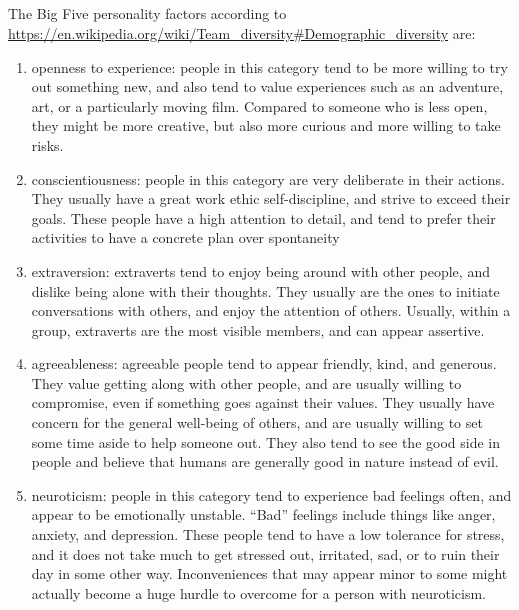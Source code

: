 \documentclass[letterpaper,12pt]{article}
\begin{document}
\subsection{}
The Big Five personality factors according to \url{https://en.wikipedia.org/wiki/Team_diversity#Demographic_diversity} are:
\begin{enumerate}
	\item openness to experience: people in this category tend to be more willing to try out something new, and also tend to
	      value experiences such as an adventure, art, or a particularly moving film. Compared to someone who is less open, they
	      might be more creative, but also more curious and more willing to take risks.
	\item conscientiousness: people in this category are very deliberate in their actions. They usually have a great work ethic
	      self-discipline, and strive to exceed their goals. These people have a high attention to detail, and tend to prefer their activities to have a concrete plan over spontaneity
	\item extraversion: extraverts tend to enjoy being around with other people, and dislike being alone with their thoughts. They usually are the ones to initiate conversations with others, and enjoy the attention of others. Usually, within a group,
	      extraverts are the most visible members, and can appear assertive.
	\item agreeableness:  agreeable people tend to appear friendly, kind, and generous. They value getting along with other people, and are usually willing to compromise, even if something goes against their values. They usually have concern for the general
	      well-being of others, and are usually willing to set some time aside to help someone out. They also tend to see the good side in people and believe that humans are generally good in nature instead of evil.
	\item neuroticism: people in this category tend to experience bad feelings often, and appear to be emotionally unstable. ``Bad'' feelings include things like anger, anxiety, and depression. These people tend to have a low tolerance for stress, and it does
	      not take much to get stressed out, irritated, sad, or to ruin their day in some other way. Inconveniences that may appear minor to some might actually become a huge hurdle to overcome for a person with neuroticism.
\end{enumerate}
\end{document}
